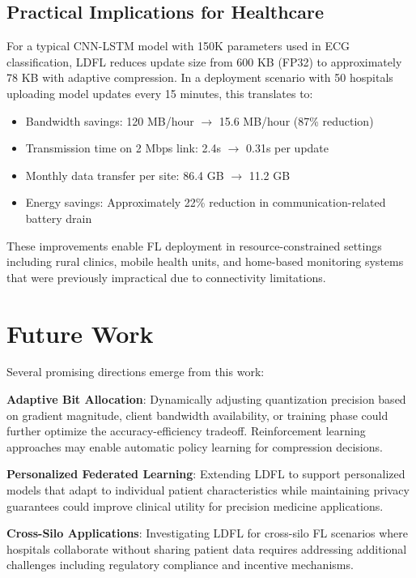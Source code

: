\documentclass[10pt,conference]{IEEEtran}
\begin{document}
\subsection{Practical Implications for Healthcare}
For a typical CNN-LSTM model with 150K parameters used in ECG classification, LDFL reduces update size from 600 KB (FP32) to approximately 78 KB with adaptive compression. In a deployment scenario with 50 hospitals uploading model updates every 15 minutes, this translates to:
\begin{itemize}
    \item Bandwidth savings: 120 MB/hour $\rightarrow$ 15.6 MB/hour (87\% reduction)
    \item Transmission time on 2 Mbps link: 2.4s $\rightarrow$ 0.31s per update
    \item Monthly data transfer per site: 86.4 GB $\rightarrow$ 11.2 GB
    \item Energy savings: Approximately 22\% reduction in communication-related battery drain
\end{itemize}
These improvements enable FL deployment in resource-constrained settings including rural clinics, mobile health units, and home-based monitoring systems that were previously impractical due to connectivity limitations.

\section{Future Work}
\label{sec:future_work}

Several promising directions emerge from this work:

\textbf{Adaptive Bit Allocation}: Dynamically adjusting quantization precision based on gradient magnitude, client bandwidth availability, or training phase could further optimize the accuracy-efficiency tradeoff. Reinforcement learning approaches may enable automatic policy learning for compression decisions.

\textbf{Personalized Federated Learning}: Extending LDFL to support personalized models that adapt to individual patient characteristics while maintaining privacy guarantees could improve clinical utility for precision medicine applications.

\textbf{Cross-Silo Applications}: Investigating LDFL for cross-silo FL scenarios where hospitals collaborate without sharing patient data requires addressing additional challenges including regulatory compliance and incentive mechanisms.
\end{document}
